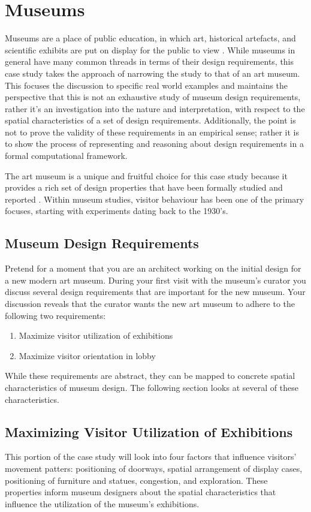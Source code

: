 \documentclass[12pt]{ucthesis}
\begin{document}
\section{Museums}
Museums are a place of public education, in which art, historical artefacts, and scientific exhibits are put on display for the public to view \cite{Falk}. While museums in general have many common threads in terms of their design requirements, this case study takes the approach of narrowing the study to that of an art museum. This focuses the discussion to specific real world examples and maintains the perspective that this is not an exhaustive study of museum design requirements, rather it's an investigation into the nature and interpretation, with respect to the spatial characteristics of a set of design requirements. Additionally, the point is not to prove the validity of these requirements in an empirical sense; rather it is to show the process of representing and reasoning about design requirements in a formal computational framework.

The art museum is a unique and fruitful choice for this case study because it provides a rich set of design properties that have been formally studied and reported \cite{Melton} \cite{Bitgood02} \cite{Falk}. Within museum studies, visitor behaviour has been one of the primary focuses, starting with experiments dating back to the 1930's. 

\subsection{Museum Design Requirements}
Pretend for a moment that you are an architect working on the initial design for a new modern art museum. During your first visit with the museum's curator you discuss several design requirements that are important for the new museum. Your discussion reveals that the curator wants the new art museum to adhere to the following two requirements:

\begin{enumerate}
\item Maximize visitor utilization of exhibitions
\item Maximize visitor orientation in lobby
\end{enumerate}

While these requirements are abstract, they can be mapped to concrete spatial characteristics of museum design. The following section looks at several of these characteristics.


\subsection{Maximizing Visitor Utilization of Exhibitions}
This portion of the case study will look into four factors that influence visitors' movement patters: positioning of doorways, spatial arrangement of display cases, positioning of furniture and statues, congestion, and exploration. These properties inform museum designers about the spatial characteristics that influence the utilization of the museum's exhibitions.
\end{document}
